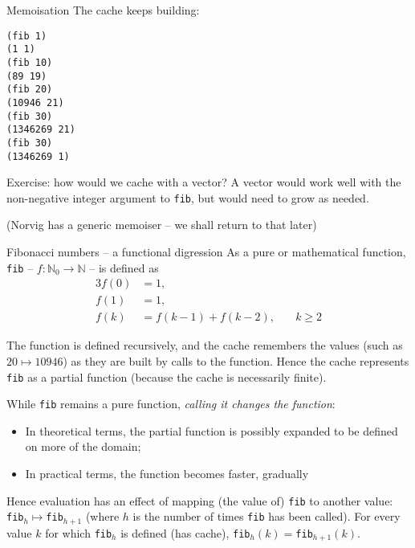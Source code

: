 \documentclass[presentation]{beamer}
\begin{document}
\begin{frame}[fragile]{Memoisation}
The cache keeps building:
\begin{verbatim}
(fib 1)
(1 1)
(fib 10)
(89 19)
(fib 20)
(10946 21)
(fib 30)
(1346269 21)
(fib 30)
(1346269 1)
\end{verbatim}

Exercise: how would we cache with a vector?  A vector would work well with the non-negative integer argument to \texttt{fib}, but would need to grow as needed.

(Norvig has a generic memoiser -- we shall return to that later)
\end{frame}

\begin{frame}[fragile]{Fibonacci numbers -- a functional digression}
  As a pure or mathematical function, \texttt{fib} -- $f:\mathbb{N}_0\to\mathbb{N}$ -- is defined as
  \begin{alignat*}{3}
    f(0)&=1,& \\
    f(1)&=1,& \\
    f(k)&=f(k-1)+f(k-2),&\quad k\geq 2
  \end{alignat*}

  The function is defined recursively, and the cache remembers the values (such as $20\mapsto 10946$) as they are built by calls to the function.  Hence the cache represents \texttt{fib} as a partial function (because the cache is necessarily finite).

  While \texttt{fib} remains a pure function, \emph{calling it changes the function}:
  \begin{itemize}
  \item In theoretical terms, the partial function is possibly expanded to be defined on more of the domain;
  \item In practical terms, the function becomes faster, gradually
  \end{itemize}
  Hence evaluation has an effect of mapping (the value of) \texttt{fib} to another value: \texttt{fib}$_h\mapsto$\texttt{fib}$_{h+1}$ (where $h$ is the number of times \texttt{fib} has been called).  For every value $k$ for which \texttt{fib}$_h$ is defined (has cache), \texttt{fib}$_h(k)=$\texttt{fib}$_{h+1}(k)$.
\end{frame}
\end{document}
